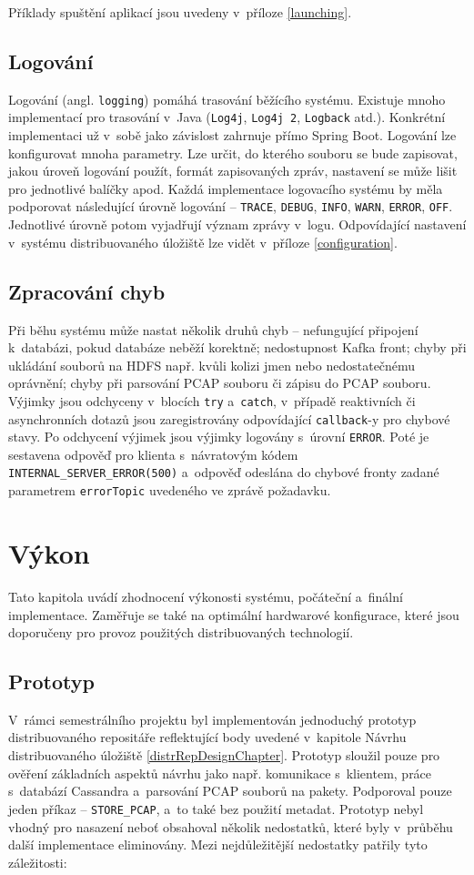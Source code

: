 Příklady spuštění aplikací jsou uvedeny v~příloze \ref{launching}.

\section{Logování}
Logování (angl. \texttt{logging}) pomáhá trasování běžícího systému. Existuje mnoho implementací pro trasování v~Java (\texttt{Log4j}, \texttt{Log4j 2}, \texttt{Logback} atd.). Konkrétní implementaci už v~sobě jako závislost zahrnuje přímo Spring Boot. Logování lze konfigurovat mnoha parametry. Lze určit, do kterého souboru se bude zapisovat, jakou úroveň logování použít, formát zapisovaných zpráv, nastavení se může lišit pro jednotlivé balíčky apod. Každá implementace logovacího systému by měla podporovat následující úrovně logování -- \texttt{TRACE}, \texttt{DEBUG}, \texttt{INFO}, \texttt{WARN}, \texttt{ERROR}, \texttt{OFF}. Jednotlivé úrovně potom vyjadřují význam zprávy v~logu. Odpovídající nastavení v~systému distribuovaného úložiště lze vidět v~příloze \ref{configuration}.

\section{Zpracování chyb}
Při běhu systému může nastat několik druhů chyb -- nefungující připojení k~databázi, pokud databáze neběží korektně; nedostupnost Kafka front; chyby při ukládání souborů na HDFS např. kvůli kolizi jmen nebo nedostatečnému oprávnění; chyby při parsování PCAP souboru či zápisu do PCAP souboru. Výjimky jsou odchyceny v~blocích \texttt{try} a~\texttt{catch}, v~případě reaktivních či asynchronních dotazů jsou zaregistrovány odpovídající \texttt{callback}-y pro chybové stavy. Po odchycení výjimek jsou výjimky logovány s~úrovní \texttt{ERROR}. Poté je sestavena odpověď pro klienta s~návratovým kódem \texttt{INTERNAL\_SERVER\_ERROR(500)} a~odpověď odeslána do chybové fronty zadané parametrem \texttt{errorTopic} uvedeného ve zprávě požadavku.

\chapter{Výkon} \label{chapter_performance}
Tato kapitola uvádí zhodnocení výkonosti systému, počáteční a~finální implementace. Zaměřuje se také na optimální hardwarové konfigurace, které jsou doporučeny pro provoz použitých distribuovaných technologií.

\section{Prototyp}
V~rámci semestrálního projektu byl implementován jednoduchý prototyp distribuovaného repositáře reflektující body uvedené v~kapitole Návrhu distribuovaného úložiště \ref{distrRepDesignChapter}. Prototyp sloužil pouze pro ověření základních aspektů návrhu jako např. komunikace s~klientem, práce s~databází Cassandra a~parsování PCAP souborů na pakety. Podporoval pouze jeden příkaz -- \texttt{STORE\_PCAP}, a~to také bez použití metadat. Prototyp nebyl vhodný pro nasazení neboť obsahoval několik nedostatků, které byly v~průběhu další implementace eliminovány. Mezi nejdůležitější nedostatky patřily tyto záležitosti:

